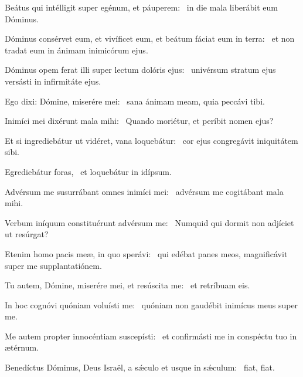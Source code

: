 \item Beátus qui intélligit super egénum, et páuperem:~\psstar{} in die mala liberábit eum Dóminus.

\item Dóminus consérvet eum, et vivíficet eum, et beátum fáciat eum in terra:~\psstar{} et non tradat eum in ánimam inimicórum ejus.

\item Dóminus opem ferat illi super lectum dolóris ejus:~\psstar{} univérsum stratum ejus versásti in infirmitáte ejus.

\item Ego dixi: Dómine, miserére mei:~\psstar{} sana ánimam meam, quia peccávi tibi.

\item Inimíci mei dixérunt mala mihi:~\psstar{} Quando moriétur, et períbit nomen ejus?

\item Et si ingrediebátur ut vidéret, vana loquebátur:~\psstar{} cor ejus congregávit iniquitátem sibi.

\item Egrediebátur foras,~\psstar{} et loquebátur in idípsum.

\item Advérsum me susurrábant omnes inimíci mei:~\psstar{} advérsum me cogitábant mala mihi.

\item Verbum iníquum constituérunt advérsum me:~\psstar{} Numquid qui dormit non adjíciet ut resúrgat?

\item Etenim homo pacis meæ, in quo sperávi:~\psstar{} qui edébat panes meos, magnificávit super me supplantatiónem.

\item Tu autem, Dómine, miserére mei, et resúscita me:~\psstar{} et retríbuam eis.

\item In hoc cognóvi quóniam voluísti me:~\psstar{} quóniam non gaudébit inimícus meus super me.

\item Me autem propter innocéntiam suscepísti:~\psstar{} et confirmásti me in conspéctu tuo in ætérnum.

\item Benedíctus Dóminus, Deus Israël, a sǽculo et usque in sǽculum:~\psstar{} fiat, fiat.

